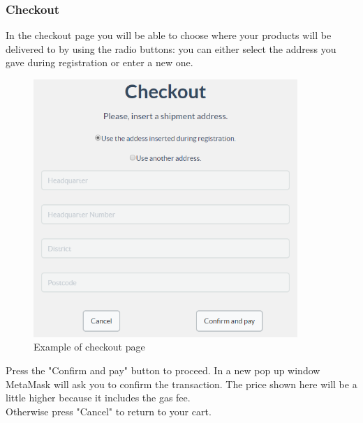 	\subsubsection{Checkout}
	In the checkout page you will be able to choose where your products will be 
	delivered to by using the radio buttons: you can either select the address you 
	gave during registration or enter a new one.\\
	\begin{figure}[H]
		\includegraphics[width=10cm]{res/images/checkout.png}
		\centering
		\caption{Example of checkout page}
	\end{figure}
	\noindent Press the "Confirm and pay" button to proceed. In a new 
	pop up window MetaMask will ask you to confirm the transaction. The price 
	shown here will be a little higher because it includes the gas fee. \\
	Otherwise press "Cancel" to return to your cart.
